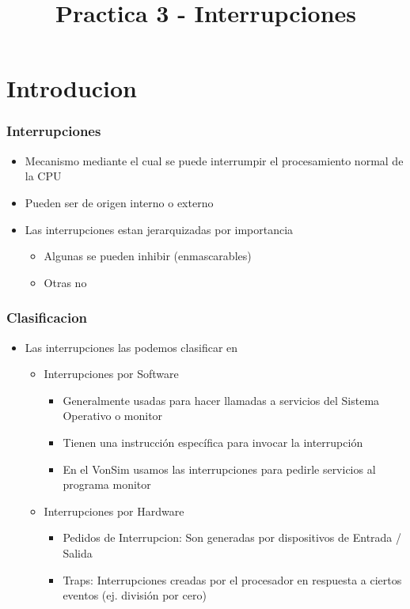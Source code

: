 \documentclass{beamer}
\title{Practica 3 - Interrupciones}
\begin{document}
\begin{frame}
\titlepage
\end{frame}

\section{Introducion}

\begin{frame}
\frametitle{Interrupciones}

\begin{itemize}
 \item Mecanismo mediante el cual se puede interrumpir el procesamiento normal de la CPU
 \item Pueden ser de origen interno o externo
 \item Las interrupciones estan jerarquizadas por importancia
 \begin{itemize}
   \item Algunas se pueden inhibir (enmascarables)
   \item Otras no
 \end{itemize}
 \end{itemize}
\end{frame}

\begin{frame}
\frametitle{Clasificacion}
\begin{itemize}
 \item Las interrupciones las podemos clasificar en
 \begin{itemize}

 \item Interrupciones por Software
 \begin{itemize}
   \item Generalmente usadas para hacer llamadas a servicios del Sistema Operativo o monitor
   \item Tienen una instrucción específica para invocar la interrupción
   \item En el VonSim usamos las interrupciones para pedirle servicios al programa monitor
 \end{itemize}

 \item Interrupciones por Hardware
 \begin{itemize}
   \item Pedidos de Interrupcion: Son generadas por dispositivos de Entrada / Salida
   \item Traps: Interrupciones creadas por el procesador en respuesta a ciertos eventos (ej. división por cero)
 \end{itemize}
 \end{itemize}
 \end{itemize}

\end{frame}
\end{document}
